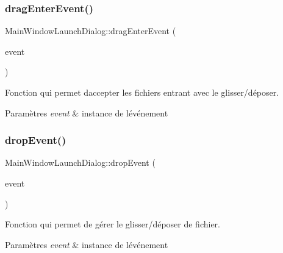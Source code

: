 \subsubsection{\texorpdfstring{drag\+Enter\+Event()}{dragEnterEvent()}}
{\footnotesize\ttfamily Main\+Window\+Launch\+Dialog\+::drag\+Enter\+Event (\begin{DoxyParamCaption}\item[{Q\+Drag\+Enter\+Event $\ast$}]{event }\end{DoxyParamCaption})\hspace{0.3cm}{\ttfamily [private]}}



Fonction qui permet d\textquotesingle{}accepter les fichiers entrant avec le glisser/déposer. 


\begin{DoxyParams}{Paramètres}
{\em event} & instance de l\textquotesingle{}événement \\
\hline
\end{DoxyParams}
\mbox{\label{classMainWindowLaunchDialog_a6b292183d418fe79b79225d9a35bd3dd}} 
\subsubsection{\texorpdfstring{drop\+Event()}{dropEvent()}}
{\footnotesize\ttfamily Main\+Window\+Launch\+Dialog\+::drop\+Event (\begin{DoxyParamCaption}\item[{Q\+Drop\+Event $\ast$}]{event }\end{DoxyParamCaption})\hspace{0.3cm}{\ttfamily [private]}}



Fonction qui permet de gérer le glisser/déposer de fichier. 


\begin{DoxyParams}{Paramètres}
{\em event} & instance de l\textquotesingle{}événement \\
\hline
\end{DoxyParams}
\mbox{\label{classMainWindowLaunchDialog_a8425a23d4ed5ab00f471a1f295e72143}} 

